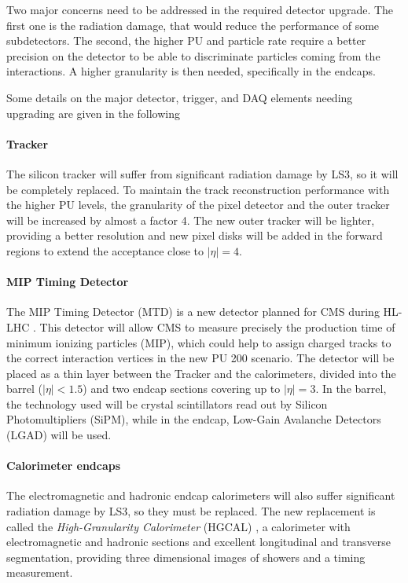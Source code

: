 \documentclass[../main.tex]{subfiles}
\begin{document}
Two major concerns need to be addressed in the required detector upgrade. The first one is the radiation damage, that would reduce the performance of some subdetectors. The second, the higher PU and particle rate require a better precision on the detector to be able to discriminate particles coming from the interactions. A higher granularity is then needed, specifically in the endcaps. 

Some details on the major detector, trigger, and DAQ elements needing upgrading are given in the following

\paragraph{Tracker}

The silicon tracker will suffer from significant radiation damage by LS3, so it will be completely replaced. To maintain the track reconstruction performance with the higher PU levels, the granularity of the pixel detector and the outer tracker will be increased by almost a factor 4. The new outer tracker will be lighter, providing a better resolution and new pixel disks will be added in the forward regions to extend the acceptance close to $|\eta| = 4$.

\paragraph{MIP Timing Detector}

The MIP Timing Detector (MTD) is a new detector planned for CMS during HL-LHC \cite{intro:exp:mtd}. This detector will allow CMS to measure precisely the production time of minimum ionizing particles (MIP), which could help to assign charged tracks to the correct interaction vertices in the new PU 200 scenario. The detector will be placed as a thin layer between the Tracker and the calorimeters, divided into the barrel ($|\eta|<1.5$) and two endcap sections covering up to $|\eta|=3$. In the barrel, the technology used will be crystal scintillators read out by Silicon Photomultipliers (SiPM), while in the endcap, Low-Gain Avalanche Detectors (LGAD) will be used.

\paragraph{Calorimeter endcaps}

The electromagnetic and hadronic endcap calorimeters will also suffer significant radiation damage by LS3, so they must be replaced. The new replacement is called the \textit{High-Granularity Calorimeter} (HGCAL) \cite{intro:exp:hgcal}, a calorimeter with electromagnetic and hadronic sections and excellent longitudinal and transverse segmentation, providing three dimensional images of showers and a timing measurement.
\end{document}
